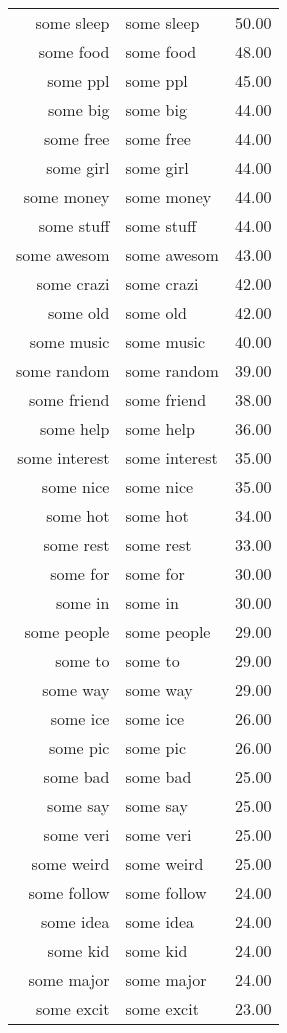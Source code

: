 \begin{table}[ht]
\begin{tabular}{rlr}
  some sleep & some sleep & 50.00 \\ 
  some food & some food & 48.00 \\ 
  some ppl & some ppl & 45.00 \\ 
  some big & some big & 44.00 \\ 
  some free & some free & 44.00 \\ 
  some girl & some girl & 44.00 \\ 
  some money & some money & 44.00 \\ 
  some stuff & some stuff & 44.00 \\ 
  some awesom & some awesom & 43.00 \\ 
  some crazi & some crazi & 42.00 \\ 
  some old & some old & 42.00 \\ 
  some music & some music & 40.00 \\ 
  some random & some random & 39.00 \\ 
  some friend & some friend & 38.00 \\ 
  some help & some help & 36.00 \\ 
  some interest & some interest & 35.00 \\ 
  some nice & some nice & 35.00 \\ 
  some hot & some hot & 34.00 \\ 
  some rest & some rest & 33.00 \\ 
  some for & some for & 30.00 \\ 
  some in & some in & 30.00 \\ 
  some people & some people & 29.00 \\ 
  some to & some to & 29.00 \\ 
  some way & some way & 29.00 \\ 
  some ice & some ice & 26.00 \\ 
  some pic & some pic & 26.00 \\ 
  some bad & some bad & 25.00 \\ 
  some say & some say & 25.00 \\ 
  some veri & some veri & 25.00 \\ 
  some weird & some weird & 25.00 \\ 
  some follow & some follow & 24.00 \\ 
  some idea & some idea & 24.00 \\ 
  some kid & some kid & 24.00 \\ 
  some major & some major & 24.00 \\ 
  some excit & some excit & 23.00 \\ 

\end{tabular}
\end{table}
